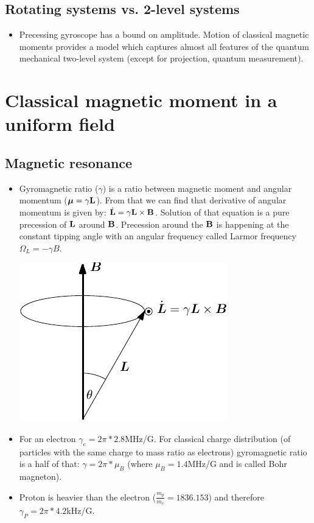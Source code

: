 \documentclass[AtomicOptical1Notes.tex]{subfiles}
\begin{document}
	\subsection{Rotating systems vs. 2-level systems}
		\begin{itemize}
			\item Precessing gyroscope has a bound on amplitude. Motion of classical magnetic moments provides a model which captures almost all features of the quantum mechanical two-level system (except for projection, quantum measurement).
		\end{itemize}
\section{Classical magnetic moment in a uniform field}
	\subsection{Magnetic resonance}
		\begin{itemize}
			\item Gyromagnetic ratio ($\gamma$) is a ratio between magnetic moment and angular momentum ($\mbox{\boldmath$ \mu $}=\gamma\mathbf{L}$). From that we can find that derivative of angular momentum is given by: $\dot{\mathbf{L}}=\gamma\mathbf{L}\times\mathbf{B}$. Solution of that equation is a pure precession of $\mathbf{L}$ around $\mathbf{B}$. Precession around the $\mathbf{B}$ is happening at the constant tipping angle with an angular frequency called Larmor frequency $\Omega_L=-\gamma B$.
			
			\includegraphics{precession}
			
			\item For an electron $\gamma_e=2\pi*2.8$MHz/G. For classical charge distribution (of particles with the same charge to mass ratio as electrons) gyromagnetic ratio is a half of that: $\gamma=2\pi*\mu_B$ (where $\mu_B = 1.4$MHz/G and is called Bohr magneton).
			\item Proton is heavier than the electron ($\frac{m_p}{m_e}=1836.153$) and therefore $\gamma_P=2\pi*4.2$kHz/G.
		\end{itemize}
		
\end{document}
